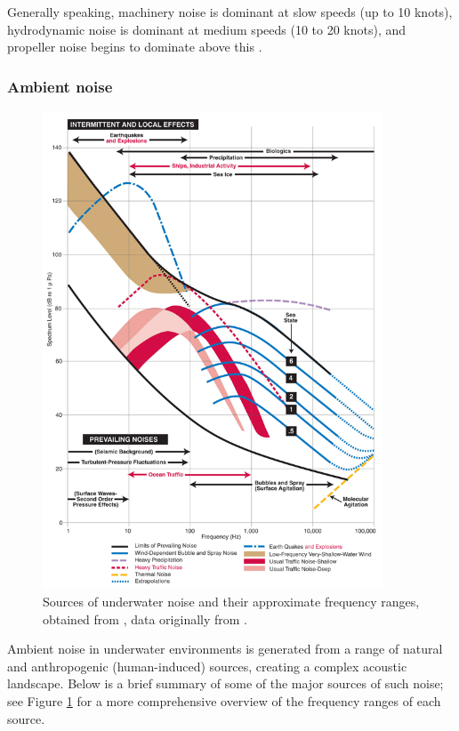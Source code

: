 Generally speaking, machinery noise is dominant at slow speeds (up to 10 knots), hydrodynamic noise is dominant at medium speeds (10 to 20 knots), and propeller noise begins to dominate above this \cite{waite_sonar_2002}. 

\subsubsection{Ambient noise}

\begin{figure}[p]
    \centering
    \includegraphics[width=0.9\textwidth]{img/ch1/uw_noise.png}
    \caption{Sources of underwater noise and their approximate frequency ranges, obtained from \cite{knowlton_what_nodate}, data originally from \cite{wenz_review_1972}.}
    \label{fig:uw-noise}
\end{figure}

Ambient noise in underwater environments is generated from a range of natural and anthropogenic (human-induced) sources, creating a complex acoustic landscape. Below is a brief summary of some of the major sources of such noise; see Figure \ref{fig:uw-noise} for a more comprehensive overview of the frequency ranges of each source.

